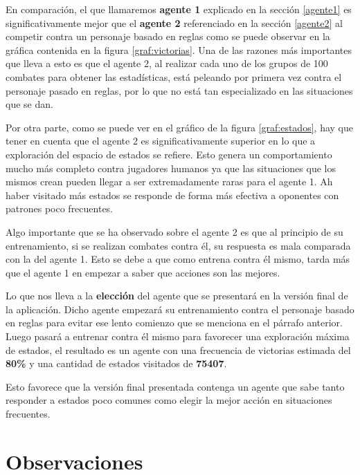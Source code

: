 En comparación, el que llamaremos \textbf{agente 1} explicado en la sección \ref{agente1} es significativamente mejor que el \textbf{agente 2} referenciado en la sección \ref{agente2} al competir contra un personaje basado en reglas como se puede observar en la gráfica contenida en la figura \ref{graf:victorias}. Una de las razones más importantes que lleva a esto es que el agente 2, al realizar cada uno de los grupos de 100 combates para obtener las estadísticas, está peleando por primera vez contra el personaje pasado en reglas, por lo que no está tan especializado en las situaciones que se dan.

\bigskip

Por otra parte, como se puede ver en el gráfico de la figura \ref{graf:estados}, hay que tener en cuenta que el agente 2 es significativamente superior en lo que a exploración del espacio de estados se refiere. Esto genera un comportamiento mucho más completo contra jugadores humanos ya que las situaciones que los mismos crean pueden llegar a ser extremadamente raras para el agente 1. Ah haber visitado más estados se responde de forma más efectiva a oponentes con patrones poco frecuentes.

\bigskip

Algo importante que se ha observado sobre el agente 2 es que al principio de su entrenamiento, si se realizan combates contra él, su respuesta es mala comparada con la del agente 1. Esto se debe a que como entrena contra él mismo, tarda más que el agente 1 en empezar a saber que acciones son las mejores.

\bigskip

Lo que nos lleva a la \textbf{elección} del agente que se presentará en la versión final de la aplicación. Dicho agente empezará su entrenamiento contra el personaje basado en reglas para evitar ese lento comienzo que se menciona en el párrafo anterior. Luego pasará a entrenar contra él mismo para favorecer una exploración máxima de estados, el resultado es un agente con una frecuencia de victorias estimada del \textbf{80\%} y una cantidad de estados visitados de \textbf{75407}.

\bigskip

Esto favorece que la versión final presentada contenga un agente que sabe tanto responder a estados poco comunes como elegir la mejor acción en situaciones frecuentes.

\section{Observaciones}

